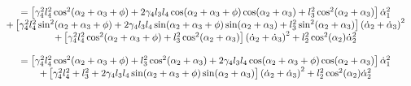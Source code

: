 \documentclass{article}
\begin{document}
\[
\begin{array}{c}
=\left[ \gamma _{4}^{2}l_{4}^{2}\cos ^{2}(\alpha _{2}+\alpha _{3}+\phi
)+2\gamma _{4}l_{3}l_{4}\cos (\alpha _{2}+\alpha _{3}+\phi )\cos (\alpha
_{2}+\alpha _{3})+l_{3}^{2}\cos ^{2}(\alpha _{2}+\alpha _{3})\right] \dot{%
\alpha}_{1}^{2} \\ 
+\left[ \gamma _{4}^{2}l_{4}^{2}\sin ^{2}(\alpha _{2}+\alpha _{3}+\phi
)+2\gamma _{4}l_{3}l_{4}\sin (\alpha _{2}+\alpha _{3}+\phi )\sin (\alpha
_{2}+\alpha _{3})+l_{3}^{2}\sin ^{2}(\alpha _{2}+\alpha _{3})\right] \left( 
\dot{\alpha}_{2}+\dot{\alpha}_{3}\right) ^{2} \\ 
+\left[ \gamma _{4}^{2}l_{4}^{2}\cos ^{2}(\alpha _{2}+\alpha _{3}+\phi
)+l_{3}^{2}\cos ^{2}(\alpha _{2}+\alpha _{3})\right] \left( \dot{\alpha}_{2}+%
\dot{\alpha}_{3}\right) ^{2}+l_{2}^{2}\cos ^{2}(\alpha _{2})\dot{\alpha}%
_{2}^{2} \\ 
\\ 
=\left[ \gamma _{4}^{2}l_{4}^{2}\cos ^{2}(\alpha _{2}+\alpha _{3}+\phi
)+l_{3}^{2}\cos ^{2}(\alpha _{2}+\alpha _{3})+2\gamma _{4}l_{3}l_{4}\cos
(\alpha _{2}+\alpha _{3}+\phi )\cos (\alpha _{2}+\alpha _{3})\right] \dot{%
\alpha}_{1}^{2} \\ 
+\left[ \gamma _{4}^{2}l_{4}^{2}+l_{3}^{2}+2\gamma _{4}l_{3}l_{4}\sin
(\alpha _{2}+\alpha _{3}+\phi )\sin (\alpha _{2}+\alpha _{3})\right] \left( 
\dot{\alpha}_{2}+\dot{\alpha}_{3}\right) ^{2}+l_{2}^{2}\cos ^{2}(\alpha _{2})%
\dot{\alpha}_{2}^{2}%
\end{array}%
\]
\end{document}

